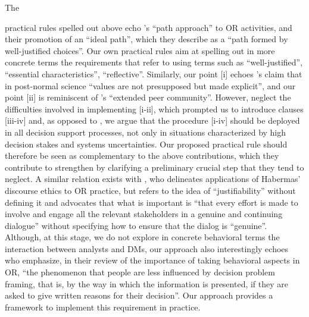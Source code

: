 \documentclass[preprint, french, english, 11pt, authoryear]{elsarticle}%
\begin{document}
The \begin{changebar}practical rules spelled out above echo \citet{lahtinen_why_2017}'s ``path approach'' to \ac{OR} activities, and their promotion of an ``ideal path'', which they describe as a ``path formed by well-justified choices''.
Our own practical rules aim at spelling out in more concrete terms the requirements that \citet{lahtinen_why_2017} refer to using terms such as ``well-justified'', ``essential characteristics'', ``reflective''.
Similarly, our point [i] echoes \citet{funtowicz_science_1993}'s claim that in post-normal science ``values are not presupposed but made explicit'', and our point [ii] is reminiscent of \citet{funtowicz_science_1993}'s ``extended peer community''.
However, \citet{funtowicz_science_1993} neglect the difficulties involved in implementing [i-ii], which prompted us to introduce clauses [iii-iv] and, as opposed to \citet{funtowicz_science_1993}, we argue that the procedure [i-iv] should be deployed in all decision support processes, 
not only in situations characterized by high decision stakes and systems uncertainties.
Our proposed practical rule should therefore be seen as complementary to the above contributions, which they contribute to strengthen by clarifying a preliminary crucial step that they tend to neglect.
A similar relation exists with \citet{mingers_ethics_2011}, who delineates applications of Habermas' discourse ethics to \ac{OR} practice, but refers to the idea of ``justifiability'' without defining it and 
advocates that what is important is ``that every effort is made to involve and engage all the relevant stakeholders in a genuine and continuing dialogue'' without specifying how to ensure that the dialog is ``genuine''.
Although, at this stage, we do not explore in concrete behavioral terms the interaction between analysts and \acp{DM}, 
our approach also interestingly echoes \citet{hamalainen_importance_2013} who emphasize, in their review of the importance of taking behavioral aspects in \ac{OR}, 
``the phenomenon that people are less influenced by decision problem framing, that is, by the way in which the information is presented, if they are asked to give written reasons for their decision''.
Our approach provides a framework to implement this requirement in practice.\end{changebar}
\end{document}
